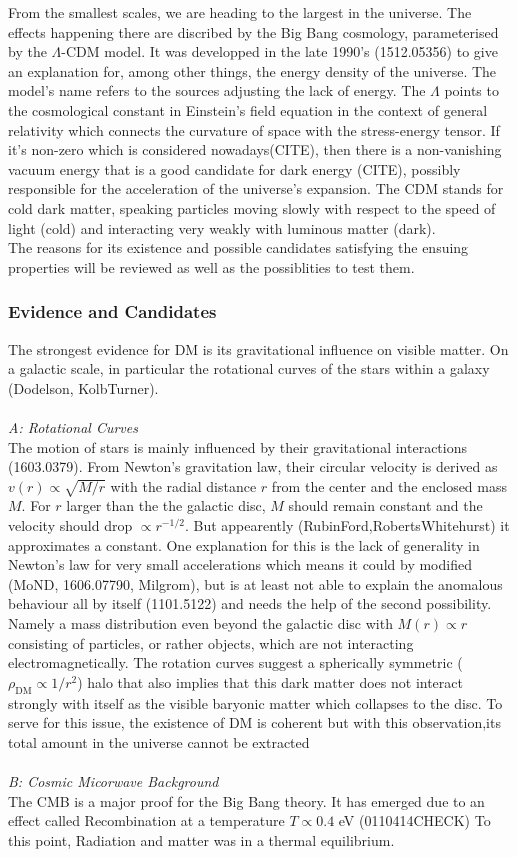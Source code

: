 From the smallest scales, we are heading to the largest in the universe. The effects happening there are discribed by the Big Bang cosmology, parameterised
by the $\Lambda$-CDM model. It was developped in the late 1990's (1512.05356) to give an explanation for, among other things, the energy density of the 
universe. The model's name refers to the sources adjusting the lack of energy. The $\Lambda$ points to the cosmological constant in Einstein's field equation
in the context of general relativity which connects the curvature of space with the stress-energy tensor. If it's non-zero which is considered nowadays(CITE), 
then there is a non-vanishing vacuum energy that is a good candidate for dark energy (CITE), possibly responsible for the acceleration of the universe's expansion.
The CDM stands for cold dark matter, speaking particles moving slowly with respect to the speed of light (cold) and interacting very weakly with luminous
matter (dark). \\
\noindent The reasons for its existence and possible candidates satisfying the ensuing properties will be reviewed as well as the possiblities to test them.
\subsubsection{Evidence and Candidates}
The strongest evidence for DM is its gravitational influence on visible matter. On a galactic scale, in particular the rotational curves of the stars
within a galaxy (Dodelson, KolbTurner). \\
\\ \textit{A: Rotational Curves}\\
\noindent The motion of stars is mainly influenced by their gravitational interactions (1603.0379). From Newton's gravitation law, their circular velocity 
is derived as
$v(r)\propto\sqrt{M/r}$ with the radial distance $r$ from the center and the enclosed mass $M$. For $r$ larger than the the galactic disc, $M$ should remain
constant and the velocity should drop $\propto r^{-1/2}$. But appearently (RubinFord,RobertsWhitehurst) it approximates a constant. One explanation for this
is the lack of generality in Newton's law for very small accelerations which means it could by modified (MoND, 1606.07790, Milgrom), but is at least not able to 
explain the anomalous behaviour all by itself (1101.5122) and needs the help of the second possibility. Namely a mass distribution even beyond the galactic
disc with $M(r)\propto r$ consisting of particles, or rather objects, which are not interacting electromagnetically. The rotation curves suggest a 
spherically symmetric ($\rho_\text{DM}\propto 1/r^2$) halo that also implies that this dark matter does not interact strongly with itself as the visible 
baryonic matter which collapses to the disc. To serve for this issue, the existence of DM is coherent but with this observation,its total amount in the 
universe cannot be extracted\\
\\ \textit{B: Cosmic Micorwave Background}\\
\noindent The CMB is a major proof for the Big Bang theory. It has emerged due to an effect called Recombination at a temperature $T\propto 0.4$ eV (0110414CHECK)
To this point, Radiation and matter was in a thermal equilibrium. 
